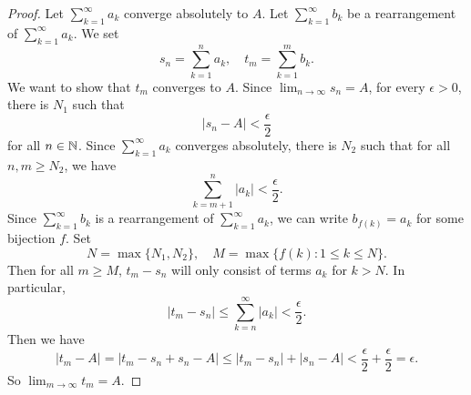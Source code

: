 \begin{proof}
  Let $\sum_{k = 1}^\infty a_k$ converge absolutely
  to $A$. Let $\sum_{k = 1}^\infty b_k$ be a
  rearrangement of $\sum_{k = 1}^\infty a_k$.
  We set
  \[s_n = \sum_{k=1}^n a_k, \quad t_m = \sum_{k=1}^m b_k.\]
  We want to show that $t_m$ converges to $A$.
  Since $\lim_{n \to \infty} s_n = A$, for every
  $\epsilon > 0$, there is $N_1$ such that
  \[
  |s_n - A| < \frac{\epsilon}{2}
  \]
  for all $n \in \mathbb{N}$. Since $\sum_{k = 1}^\infty a_k$
  converges absolutely, there is $N_2$ such that
  for all $n, m \ge N_2$, we have
  \[
    \sum_{k = m + 1}^n |a_k| < \frac{\epsilon}{2}
  .\]
  Since $\sum_{k = 1}^\infty b_k$ is a rearrangement
  of $\sum_{k = 1}^\infty a_k$, we can write
  $b_{f(k)} = a_k$ for some bijection $f$.
  Set
  \[N = \max\{N_1, N_2\}, \quad M = \max\{f(k) : 1 \le k \le N\}.\]
  Then for all $m \ge M$, $t_m - s_n$ will only
  consist of terms $a_k$ for $k > N$. In particular,
  \[|t_m - s_n| \le \sum_{k=n}^\infty |a_k| < \frac{\epsilon}{2}.\]
  Then we have
  \[|t_m - A| = |t_m - s_n + s_n - A|
  \le |t_m - s_n| + |s_n - A| < \frac{\epsilon}{2} + \frac{\epsilon}{2}
  = \epsilon.\]
  So $\lim_{m \to \infty} t_m = A$.
\end{proof}
